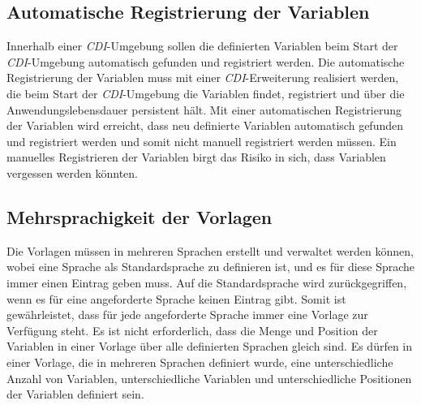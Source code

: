 \subsection{Automatische Registrierung der Variablen}
Innerhalb einer \emph{CDI}-Umgebung sollen die definierten Variablen beim Start der \emph{CDI}-Umgebung automatisch gefunden und registriert werden. Die automatische Registrierung der Variablen muss mit einer \emph{CDI}-Erweiterung realisiert werden, die beim Start der \emph{CDI}-Umgebung die Variablen findet, registriert und über die Anwendungslebensdauer persistent hält. Mit einer automatischen Registrierung der Variablen wird erreicht, dass neu definierte Variablen automatisch gefunden und registriert werden und somit nicht manuell registriert werden müssen. Ein manuelles Registrieren der Variablen birgt das Risiko in sich, dass Variablen vergessen werden könnten.

\subsection{Mehrsprachigkeit der Vorlagen}
Die Vorlagen müssen in mehreren Sprachen erstellt und verwaltet werden können, wobei eine Sprache als Standardsprache zu definieren ist, und es für diese Sprache immer einen Eintrag geben muss. Auf die Standardsprache wird zurückgegriffen, wenn es für eine angeforderte Sprache keinen Eintrag gibt. Somit ist gewährleistet, dass für jede angeforderte Sprache immer eine Vorlage zur Verfügung steht. Es ist nicht erforderlich, dass die Menge und Position der Variablen in einer Vorlage über alle definierten Sprachen gleich sind. Es dürfen in einer Vorlage, die in mehreren Sprachen definiert wurde, eine unterschiedliche Anzahl von Variablen, unterschiedliche Variablen und unterschiedliche Positionen der Variablen definiert sein.

